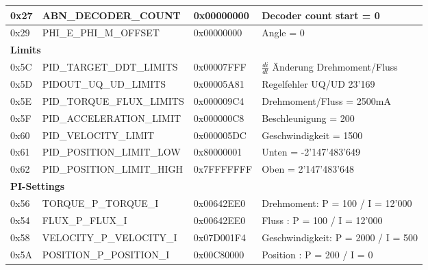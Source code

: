 \begin{table}[H]
\begin{tabularx}{\linewidth}{|l|l|l|X|}
0x27         & ABN\_DECODER\_COUNT           & 0x00000000 & Decoder count start = 0 \\ \hline
0x29         & PHI\_E\_PHI\_M\_OFFSET  & 0x00000000 & Angle = 0    \\ \hline
\multicolumn{4}{|l|}{\textbf{Limits}}                         \\ \hline
0x5C         & PID\_TARGET\_DDT\_LIMITS & 0x00007FFF & $\frac{di}{dt}$ Änderung Drehmoment/Fluss   \\ \hline
0x5D         & PIDOUT\_UQ\_UD\_LIMITS         & 0x00005A81 &    Regelfehler UQ/UD 23'169\\ \hline
0x5E         & PID\_TORQUE\_FLUX\_LIMITS      & 0x000009C4 &    Drehmoment/Fluss = 2500mA\\ \hline
0x5F         & PID\_ACCELERATION\_LIMIT      & 0x000000C8 & Beschleunigung = 200     \\ \hline
0x60         & PID\_VELOCITY\_LIMIT          & 0x000005DC & Geschwindigkeit = 1500    \\ \hline
0x61         & PID\_POSITION\_LIMIT\_LOW & 0x80000001 &    Unten = -2'147'483'649 \\ \hline
0x62         & PID\_POSITION\_LIMIT\_HIGH     & 0x7FFFFFFF & Oben  = 2'147'483'648  \\ \hline
\multicolumn{4}{|l|}{\textbf{PI-Settings}}       \\ \hline
0x56         & TORQUE\_P\_TORQUE\_I    & 0x00642EE0 &  Drehmoment: P = 100 / I = 12'000   \\ \hline
0x54         & FLUX\_P\_FLUX\_I  & 0x00642EE0 &  Fluss : P = 100 / I = 12'000   \\ \hline
0x58         & VELOCITY\_P\_VELOCITY\_I  & 0x07D001F4 & Geschwindigkeit: P = 2000 / I = 500    \\ \hline
0x5A         & POSITION\_P\_POSITION\_I  & 0x00C80000 & Position : P = 200 / I = 0    \\ \hline
\end{tabularx}
\end{table}


%
%

